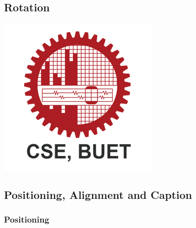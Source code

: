 \documentclass[twocolumn]{article}
\begin{document}
\subsection{Rotation}
\includegraphics[scale=.5,angle=45]{Images/CSE_BUET.png}

\pagebreak

\subsection{Positioning, Alignment and Caption }

\subsubsection{Positioning}
\end{document}
